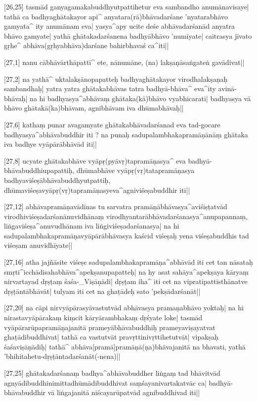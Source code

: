 [26,25] tasmād ganyagamakabuddhyutpattihetur eva sambandho anumānavisaye| tathā ca badhyaghātakayor api^ anyatara(rā)bhāvadarśane 'nyatarabhāvo gamyata^ ity anumānam eva| yasya^apy ucite deśe abhāvadarśanād anyatra bhāvo gamyate| yathā ghātakadarśanena badhyābhāvo 'numīyate| caitrasya jīvato gṛhe^ abhāva(gṛhyabhāva)darśane bahirbhavaś ca^iti||

[27,1] nanu cābhāvārthāpattī^ ete, nānumāne, (na) lakṣaṇāsaṅgateṅ gavādivat||

[27,2] na yathā^ uktalakṣānopapatteḥ badhyaghātakayor virodhalakṣaṇaḥ sambandhaḥ| yatra yatra ghātakabhāvas tatra badhyā-bhāva^ eva^ity avinā-bhāvaḥ| na hi badhyasya^abhāvaṃ ghātaka(kā)bhāvo vyabhicarati| badhyasya vā bhāvo ghātakā(ka)bhāvam, agnibhāvam iva dhūmabhāvaḥ||

[27,6] kathaṃ punar avagamyate ghātakabhāvadarśanad eva tad-gocare badhyasya^abhāvabuddhir iti ? na punaḥ sadupalambhakapramāṇānāṃ ghātaka iva badhye vyāpārābhāvād iti||

[27,8] ucyate ghātakabhāve vyāpṛ(pyāvṛ)tapramāṇasya^ eva badhyā-bhāvabuddhiupapattiḥ, dhūmabhāve vyāpṛ(vṛ)tatapramāṇasya badhyaviśeṣābhāvabuddhyutpattiḥ, dhūmaviśeṣavyāpṛ(vṛ)tapramāṇasyeva^agniviśeṣabuddhir iti||

[27,12] abhāvapramāṇavādinas tu sarvatra pramāṇābhāvasya^aviśiṣṭatvād virodhiviśeṣadarśanānuvidhānaṃ virodhyantarābhāvadarśanasya^anupapannaṃ, liṅgaviśeṣa^anuvudhānam iva liṅgiviśeṣadarśanasya| na hi sadupalambhakapramāṇavyāpārābhāvasya kaścid viśeṣaḥ yena viśeṣabuddhis tad viśeṣam anuvidhīyate||

[27,16] atha jajñāsite viśeṣe sadupalambhakapramāṇa^abhāvād iti cet tan nāsataḥ smṛti^icchādisahabhāva^apekṣanupapatteḥ| na hy asat sahāya^apekṣaya kāryaṃ nirvartayad dṛṣṭaṃ śaśa-_Viṣāṇādi| dṛṣṭam iha^ iti cet na vipratipattisthānatve dṛṣṭāntābhāvāt| tulyam iti cet na ghaṭādeḥ sato 'pekṣādarśanāt||

[27,20] na cāpi nirvyāpārasyāvastutvād abhāvasya pramaṇabhāvo yoktaḥ| na hi nirastavyāpārakaṃ kiṃcit kāryārambhakaṃ dṛśyate loke| tasmād vyāpārarūpapramāṇajanitā prameyābhāvabuddhiḥ prameyaviṣayatvat ghaṭādibuddhivat| tathā ca vastutvāt pravṛttinivṛttihetutvāt| vipakṣaḥ śaśaviṣāṇādiḥ| tathā^ abhāva[pramā]pramāṇā(ṇa)bhāvajanitā na bhavati, yathā 'bhihitahetu-dṛṣṭāntadarśanāt(-nena)||

[27,25] ghātakadarśanaṃ badhya^abhāvabuddher liṅgaṃ tad bhāvitvād agnyādibuddhinimittadhūmādibuddhivat saṃśayanivartakatvāc ca| badhyā-bhāvabuddhir vā liṅgajanitā niścayarūpatvād agnibuddhivad iti||


